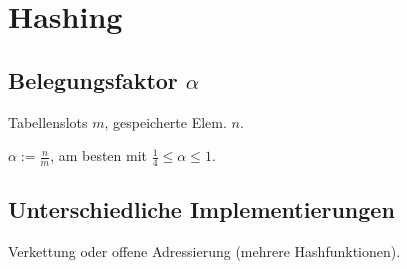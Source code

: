 \section*{Hashing}

\subsection*{Belegungsfaktor $\alpha$}
Tabellenslots $m$, gespeicherte Elem. $n$.

$\alpha := \frac{n}{m}$, am besten mit $\frac{1}{4} \le \alpha \le 1$.

\subsection*{Unterschiedliche Implementierungen}
Verkettung oder offene Adressierung (mehrere Hashfunktionen).
